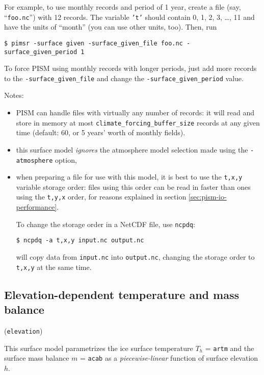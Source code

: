 \documentclass[titlepage,letterpaper,final]{scrartcl}
\begin{document}
For example, to use monthly records and period of 1 year, create a file (say, ``\texttt{foo.nc}'') with 12 records. The variable \texttt{'t'} should contain 0, 1, 2, 3, \dots, 11 and have the units of ``month'' (you can use other units, too). Then, run
\begin{verbatim}
$ pimsr -surface given -surface_given_file foo.nc -surface_given_period 1
\end{verbatim}%

To force PISM using monthly records with longer periods, just add more records to the \texttt{-surface_given_file}  and change the \texttt{-surface_given_period} value.

\noindent Notes:
\begin{itemize}
\item PISM can handle files with virtually any number of records: it will
  read and store in memory at most \texttt{climate_forcing_buffer_size} records
  at any given time (default: 60, or 5 years' worth of monthly fields).
\item this surface model \emph{ignores} the atmosphere model selection made
  using the \texttt{-atmosphere} option,
\item when preparing a file for use with this model, it is best to use the \texttt{t,x,y} variable storage order: files using this order can be read in faster than ones using the \texttt{t,y,x} order, for reasons explained in section \ref{sec:pism-io-performance}.

  To change the storage order in a NetCDF file, use \texttt{ncpdq}:
\begin{verbatim}
$ ncpdq -a t,x,y input.nc output.nc
\end{verbatim}%
  will copy data from \texttt{input.nc} into \texttt{output.nc}, changing the storage order to \texttt{t,x,y} at the same time.
\end{itemize}

\subsection{Elevation-dependent temperature and mass balance}
\label{sec:elev-depend-temp}

(\texttt{elevation})

This surface model parametrizes the ice surface temperature $T_{h}$ = \texttt{artm} and the surface mass balance $m$ = \texttt{acab} as a \emph{piecewise-linear} function of surface elevation $h$.
\end{document}

